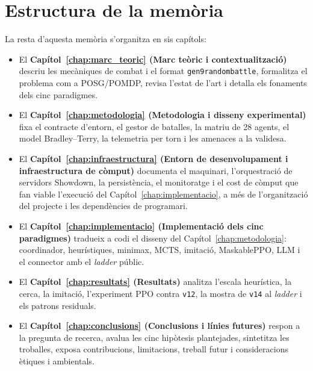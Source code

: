 \section{Estructura de la memòria}

La resta d'aquesta memòria s'organitza en sis capítols:

\begin{itemize}
    \item El \textbf{Capítol~\ref{chap:marc_teoric} (Marc teòric i contextualització)} descriu les mecàniques de combat i el format \texttt{gen9randombattle}, formalitza el problema com a POSG/POMDP, revisa l'estat de l'art i detalla els fonaments dels cinc paradigmes.
    \item El \textbf{Capítol~\ref{chap:metodologia} (Metodologia i disseny experimental)} fixa el contracte d'entorn, el gestor de batalles, la matriu de 28 agents, el model Bradley--Terry, la telemetria per torn i les amenaces a la validesa.
    \item El \textbf{Capítol~\ref{chap:infraestructura} (Entorn de desenvolupament i infraestructura de còmput)} documenta el maquinari, l'orquestració de servidors Showdown, la persistència, el monitoratge i el cost de còmput que fan viable l'execució del Capítol~\ref{chap:implementacio}, a més de l'organització del projecte i les dependències de programari.
    \item El \textbf{Capítol~\ref{chap:implementacio} (Implementació dels cinc paradigmes)} tradueix a codi el disseny del Capítol~\ref{chap:metodologia}: coordinador, heurístiques, minimax, MCTS, imitació, MaskablePPO, LLM i el connector amb el \emph{ladder} públic.
    \item El \textbf{Capítol~\ref{chap:resultats} (Resultats)} analitza l'escala heurística, la cerca, la imitació, l'experiment PPO contra \texttt{v12}, la mostra de \texttt{v14} al \emph{ladder} i els patrons residuals.
    \item El \textbf{Capítol~\ref{chap:conclusions} (Conclusions i línies futures)} respon a la pregunta de recerca, avalua les cinc hipòtesis plantejades, sintetitza les troballes, exposa contribucions, limitacions, treball futur i consideracions ètiques i ambientals.
\end{itemize}
